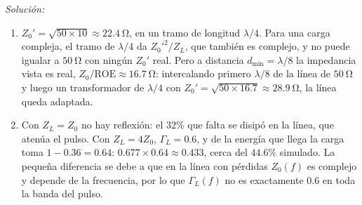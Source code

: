 \documentclass[a4paper,11pt]{article}
\newenvironment{solucion}[1][]{
\noindent \large \textsl{Solución:} \ifthenelse{\equal{#1}{}}{}{\emph{(#1)}}

\smallskip
}{
\bigskip
}
\begin{document}
\begin{solucion}
\begin{enumerate}
\begin{equation*}
Z_L=Z_0\frac{1+\Gamma_L}{1-\Gamma_L}=50\,\frac{1-j0.5}{1+j0.5}=30-j40\ \unit{\ohm},
\end{equation*}
que es una de las cargas de la parte 1. En la carta: se traza la circunferencia de ROE $3$, se ubica el mínimo en el semieje real negativo ($\zeta=1/3$), y se gira $\lambda/8$ en sentido antihorario (hacia la carga) hasta $\zeta_L=0.6-j0.8$.
\item $Z_0'=\sqrt{50\times10}\approx22.4\ \unit{\ohm}$, en un tramo de longitud $\lambda/4$. Para una carga compleja, el tramo de $\lambda/4$ da $Z_0'^2/Z_L$, que también es complejo, y no puede igualar a $50\ \unit{\ohm}$ con ningún $Z_0'$ real. Pero a distancia $d_{\min}=\lambda/8$ la impedancia vista es real, $Z_0/\mathrm{ROE}\approx16.7\ \unit{\ohm}$: intercalando primero $\lambda/8$ de la línea de $50\ \unit{\ohm}$ y luego un transformador de $\lambda/4$ con $Z_0'=\sqrt{50\times16.7}\approx28.9\ \unit{\ohm}$, la línea queda adaptada.
\item Con $Z_L=Z_0$ no hay reflexión: el $32\%$ que falta se disipó en la línea, que atenúa el pulso. Con $Z_L=4Z_0$, $\Gamma_L=0.6$, y de la energía que llega la carga toma $1-0.36=0.64$: $0.677\times0.64\approx0.433$, cerca del $44.6\%$ simulado. La pequeña diferencia se debe a que en la línea con pérdidas $Z_0(f)$ es complejo y depende de la frecuencia, por lo que $\Gamma_L(f)$ no es exactamente $0.6$ en toda la banda del pulso.
\end{enumerate}
\end{solucion}
\end{document}
